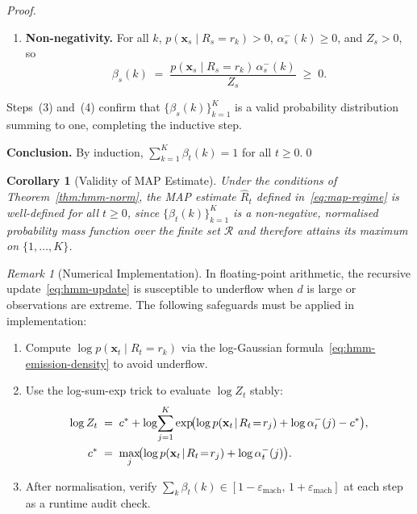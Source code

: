 \documentclass[12pt,openany]{book}
\newcommand{\bfx}{\mathbf{x}}
\numberwithin{equation}{chapter}
\theoremstyle{plain}
\newtheorem{corollary}[theorem]{Corollary}
\theoremstyle{definition}
\theoremstyle{remark}
\newtheorem{remark}[theorem]{Remark}
\numberwithin{equation}{chapter}
\theoremstyle{plain}
\begin{document}
\begin{proof}
\begin{enumerate}
  \item \textbf{Non-negativity.}
        For all $k$, $p(\bfx_s \mid R_s = r_k) > 0$,
        $\alpha_s^{-}(k) \geq 0$, and $Z_s > 0$, so
        \begin{equation}
          \beta_s(k) \;=\;
          \frac{p(\bfx_s \mid R_s = r_k)\,\alpha_s^{-}(k)}{Z_s}
          \;\geq\; 0.
          \label{eq:proof-step4}
        \end{equation}
\end{enumerate}

Steps~(3) and~(4) confirm that $\{\beta_s(k)\}_{k=1}^K$ is a valid
probability distribution summing to one, completing the inductive step.

\medskip
\noindent\textbf{Conclusion.}
By induction, $\sum_{k=1}^{K}\beta_t(k) = 1$ for all $t \geq 0$.\qed
\end{proof}

\begin{corollary}[Validity of MAP Estimate]
\label{cor:map-valid}
Under the conditions of Theorem~\ref{thm:hmm-norm}, the MAP estimate
$\hat{R}_t$ defined in~\eqref{eq:map-regime} is well-defined for all
$t \geq 0$, since $\{\beta_t(k)\}_{k=1}^K$ is a non-negative,
normalised probability mass function over the finite set $\mathcal{R}$
and therefore attains its maximum on $\{1,\ldots,K\}$.
\end{corollary}

\begin{remark}[Numerical Implementation]
\label{rem:hmm-numerical}
In floating-point arithmetic, the recursive update~\eqref{eq:hmm-update}
is susceptible to underflow when $d$ is large or observations are
extreme.  The following safeguards must be applied in implementation:
\begin{enumerate}
  \item Compute $\log p(\bfx_t \mid R_t = r_k)$ via the log-Gaussian
        formula~\eqref{eq:hmm-emission-density} to avoid underflow.
  \item Use the log-sum-exp trick to evaluate $\log Z_t$ stably:
        \begin{align}
          \log Z_t
          &\;=\;
          c^* + \log\!\sum_{j=1}^{K}
            \exp\!\bigl(
              \log p(\bfx_t \!\mid\! R_t \!=\! r_j)
              + \log \alpha_t^{-}(j) - c^*
            \bigr),
          \label{eq:logsumexp}
          \\
          c^*
          &\;=\;
          \max_{j}\!\bigl(
            \log p(\bfx_t \!\mid\! R_t \!=\! r_j) + \log \alpha_t^{-}(j)
          \bigr).
          \notag
        \end{align}
  \item After normalisation, verify $\sum_k \beta_t(k) \in
        [1 - \varepsilon_{\mathrm{mach}},\, 1 + \varepsilon_{\mathrm{mach}}]$
        at each step as a runtime audit check.
\end{enumerate}
\end{remark}
\end{document}
